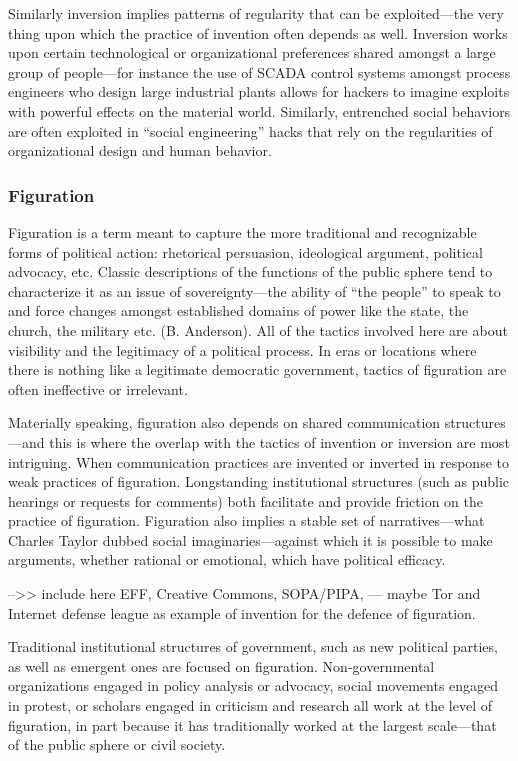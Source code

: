 \documentclass[10pt,letter,oneside]{scrartcl}
\begin{document}
Similarly inversion implies patterns of regularity that can be exploited---the very thing upon which the practice of invention often depends as well.  Inversion works upon certain technological or organizational preferences shared amongst a large group of people—for instance the use of SCADA control systems amongst process engineers who design large industrial plants allows for hackers to imagine exploits with powerful effects on the material world.   Similarly, entrenched social behaviors are often exploited in ``social engineering'' hacks that rely on the regularities of organizational design and human behavior.

\subsubsection{Figuration}

Figuration is a term meant to capture the more traditional and recognizable forms of political action: rhetorical persuasion, ideological argument, political advocacy, etc.  Classic descriptions of the functions of the public sphere tend to characterize it as an issue of sovereignty---the ability of ``the people'' to speak to and force changes amongst established domains of power like the state, the church, the military etc. (B. Anderson).  All of the tactics involved here are about visibility and the legitimacy of a political process.  In eras or locations where there is nothing like a legitimate democratic government, tactics of figuration are often ineffective or irrelevant. 

Materially speaking, figuration also depends on shared communication structures---and this is where the overlap with the tactics of invention or inversion are most intriguing.  When communication practices are invented or inverted in response to weak practices of figuration.  Longstanding institutional structures (such as public hearings or requests for comments) both facilitate and provide friction on the practice of figuration.  Figuration also implies a stable set of narratives---what Charles Taylor dubbed social imaginaries---against which it is possible to make arguments, whether rational or emotional, which have political efficacy. 

-->> include here EFF, Creative Commons, SOPA/PIPA, --- maybe Tor and Internet defense league as example of invention for the defence of figuration.  

Traditional institutional structures of government, such as new political parties, as well as emergent ones are focused on figuration. Non-governmental organizations engaged in policy analysis or advocacy, social movements engaged in protest, or scholars engaged in criticism and research all work at the level of figuration, in part because it has traditionally worked at the largest scale—that of the public sphere or civil society.
\end{document}

